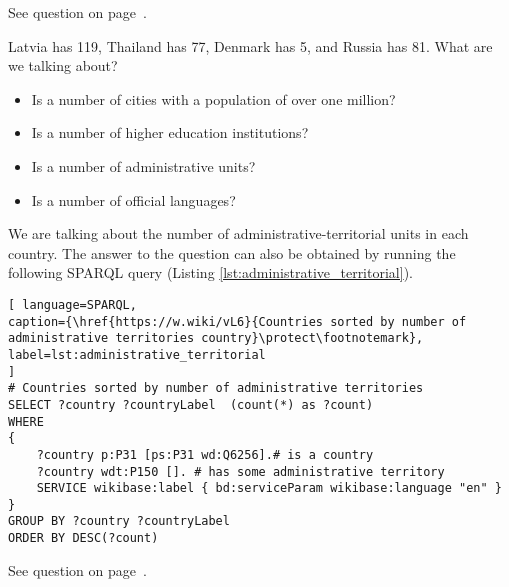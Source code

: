 See question on page~\pageref{question:official_language}.
\begin{exercise}
\label{answer:administrative_territorial}

Latvia has 119, Thailand has 77, Denmark has 5, and Russia has 81. What are we talking about?
\begin{itemize}
\item Is a number of cities with a population of over one million?
\item Is a number of higher education institutions?
\item Is a number of administrative units?
\item Is a number of official languages?
\end{itemize}

\end{exercise}

We are talking about the number of administrative-territorial units in each country. The answer to the question can also be obtained by running the following SPARQL query (Listing \ref{lst:administrative_territorial}).

\begin{lstlisting}[ language=SPARQL, 
caption={\href{https://w.wiki/vL6}{Countries sorted by number of administrative territories country}\protect\footnotemark},
label=lst:administrative_territorial
]
# Countries sorted by number of administrative territories
SELECT ?country ?countryLabel  (count(*) as ?count)
WHERE
{
	?country p:P31 [ps:P31 wd:Q6256].# is a country
	?country wdt:P150 []. # has some administrative territory
	SERVICE wikibase:label { bd:serviceParam wikibase:language "en" }
}
GROUP BY ?country ?countryLabel
ORDER BY DESC(?count)
\end{lstlisting}

See question on page~\pageref{question:administrative_territorial}.

